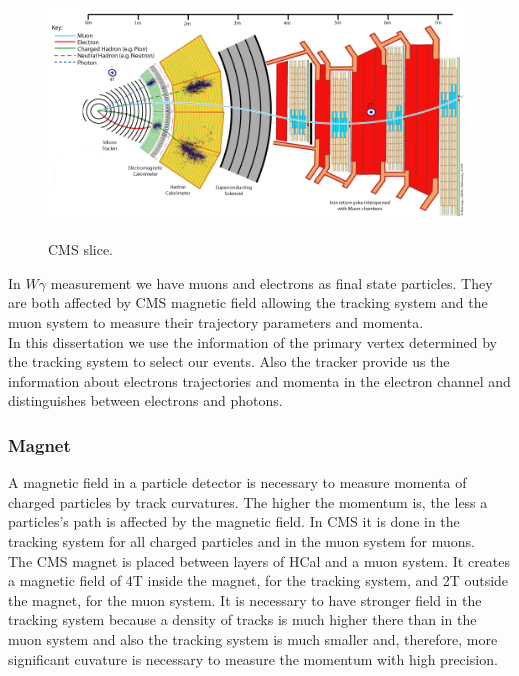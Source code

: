 \begin{figure}[htb]
  \begin{center}
    {\includegraphics[width=0.98\textwidth]{../figs/Exp/CMS_Slice.png}}
    \caption{CMS slice.}
    \label{fig:CMS_slice}
  \end{center}
\end{figure}


In $W\gamma$ measurement we have muons and electrons as final state particles. They are both affected by CMS magnetic field allowing the tracking system and the muon system to measure their trajectory parameters and momenta.\\
In this dissertation we use the information of the primary vertex determined by the tracking system to select our events. Also the tracker provide us the information about electrons trajectories and momenta in the electron channel and distinguishes between electrons and photons.\\

\subsubsection{Magnet}

A magnetic field in a particle detector is necessary to measure momenta of charged particles by track curvatures. The higher the momentum is, the less a particles's path is affected by the magnetic field. In CMS it is done in the tracking system for all charged particles and in the muon system for muons.\\

The CMS magnet is placed between layers of HCal and a muon system. It creates a magnetic field of 4T inside the magnet, for the tracking system, and 2T outside the magnet, for the muon system. It is necessary to have stronger field in the tracking system because a density of tracks is much higher there than in the muon system and also the tracking system is much smaller and, therefore, more significant cuvature is necessary to measure the momentum with high precision.\\

